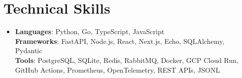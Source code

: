 \documentclass[letterpaper,11pt]{article}
\begin{document}
\section{Technical Skills}
\begin{itemize}[leftmargin=0.15in, label={}, topsep=0pt, itemsep=0pt, parsep=0pt, partopsep=0pt]
  \item{\fontsize{9.0pt}{9.25pt}\selectfont
   \textbf{Languages}{: Python, Go, TypeScript, JavaScript} \\
   \textbf{Frameworks}{: FastAPI, Node.js, React, Next.js, Echo, SQLAlchemy, Pydantic} \\
   \textbf{Tools}{: PostgreSQL, SQLite, Redis, RabbitMQ, Docker, GCP Cloud Run, GitHub Actions, Prometheus, OpenTelemetry, REST APIs, JSONL} \\
  }
\end{itemize}
\end{document}
